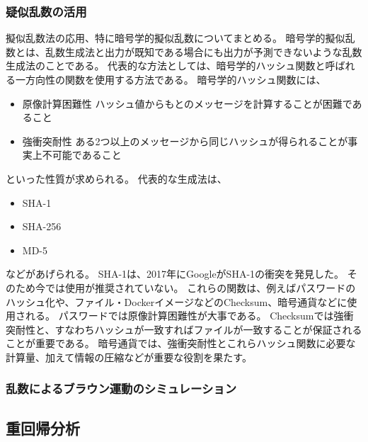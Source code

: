\documentclass[../../../main]{subfiles}
\begin{document}
\subsubsection{疑似乱数の活用}
擬似乱数法の応用、特に暗号学的擬似乱数についてまとめる。
暗号学的擬似乱数とは、乱数生成法と出力が既知である場合にも出力が予測できないような乱数生成法のことである。
代表的な方法としては、暗号学的ハッシュ関数と呼ばれる一方向性の関数を使用する方法である。
暗号学的ハッシュ関数には、
\begin{itemize}
	\item 原像計算困難性
	      ハッシュ値からもとのメッセージを計算することが困難であること
	\item 強衝突耐性
	      ある2つ以上のメッセージから同じハッシュが得られることが事実上不可能であること
\end{itemize}
といった性質が求められる。
代表的な生成法は、
\begin{itemize}
	\item SHA-1
	\item SHA-256
	\item MD-5
\end{itemize}
などがあげられる。
SHA-1は、2017年にGoogleがSHA-1の衝突を発見した。\cite{google-sha1-collision}
そのため今では使用が推奨されていない。
これらの関数は、例えばパスワードのハッシュ化や、ファイル・DockerイメージなどのChecksum、暗号通貨などに使用される。
パスワードでは原像計算困難性が大事である。
Checksumでは強衝突耐性と、すなわちハッシュが一致すればファイルが一致することが保証されることが重要である。
暗号通貨では、強衝突耐性とこれらハッシュ関数に必要な計算量、加えて情報の圧縮などが重要な役割を果たす。

\subsubsection{乱数によるブラウン運動のシミュレーション}


\subsection{重回帰分析}
\end{document}
